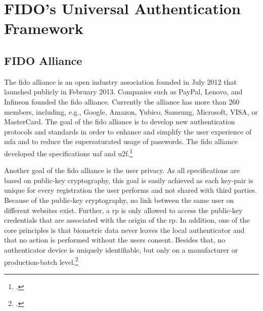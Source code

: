 \section{FIDO's Universal Authentication Framework}
\subsection{FIDO Alliance}
\label{subsec:fido_alliance}

The \gls{fido} alliance is an open industry association founded in July 2012 that launched publicly in February 2013. Companies such as PayPal, Lenovo, and Infineon founded the \gls{fido} alliance. Currently the alliance has more than 260 members, including, e.g., Google, Amazon, Yubico, Samsung, Microsoft, VISA, or MasterCard. The goal of the \gls{fido} alliance is to develop new authentication protocols and standards in order to enhance and simplify the user experience of \gls{mfa} and to reduce the supersaturated usage of passwords. The \gls{fido} alliance developed the specifications \gls{uaf} and \gls{u2f}.\footcites[See][]{fido-history}[See][583]{eckert-it-sec-9}[See][17]{fido-ct-2}

Another goal of the \gls{fido} alliance is the user privacy. As all specifications are based on public-key cryptography, this goal is easily achieved as each key-pair is unique for every registration the user performs and not shared with third parties. Because of the public-key cryptography, no link between the same user on different websites exist. Further, a \gls{rp} is only allowed to access the public-key credentials that are associated with the origin of the \gls{rp}. In addition, one of the core principles is that biometric data never leaves the local authenticator and that no action is performed without the users consent. Besides that, no authenticator device is uniquely identifiable, but only on a manufacturer or production-batch level.\footcite[See][6--7]{fido-privacy}


